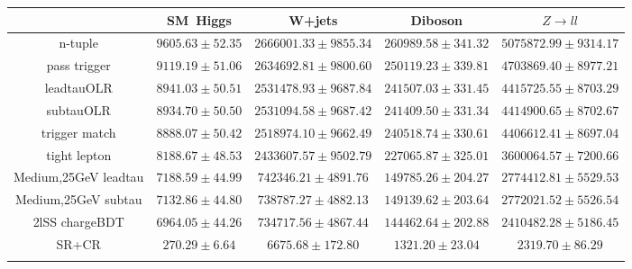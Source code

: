 \centering
\begin{tabular}{ccccc} \toprule\toprule
 & SM~Higgs & W+jets & Diboson & $Z\to ll$\\\midrule
n-tuple & $9605.63\pm52.35$ & $2666001.33\pm9855.34$ & $260989.58\pm341.32$ & $5075872.99\pm9314.17$\\
pass trigger & $9119.19\pm51.06$ & $2634692.81\pm9800.60$ & $250119.23\pm339.81$ & $4703869.40\pm8977.21$\\
leadtauOLR & $8941.03\pm50.51$ & $2531478.93\pm9687.84$ & $241507.03\pm331.45$ & $4415725.55\pm8703.29$\\
subtauOLR & $8934.70\pm50.50$ & $2531094.58\pm9687.42$ & $241409.50\pm331.34$ & $4414900.65\pm8702.67$\\
trigger match & $8888.07\pm50.42$ & $2518974.10\pm9662.49$ & $240518.74\pm330.61$ & $4406612.41\pm8697.04$\\
tight lepton & $8188.67\pm48.53$ & $2433607.57\pm9502.79$ & $227065.87\pm325.01$ & $3600064.57\pm7200.66$\\
Medium,25GeV leadtau & $7188.59\pm44.99$ & $742346.21\pm4891.76$ & $149785.26\pm204.27$ & $2774412.81\pm5529.53$\\
Medium,25GeV subtau & $7132.86\pm44.80$ & $738787.27\pm4882.13$ & $149139.62\pm203.64$ & $2772021.52\pm5526.54$\\
2lSS chargeBDT & $6964.05\pm44.26$ & $734717.56\pm4867.44$ & $144462.64\pm202.88$ & $2410482.28\pm5186.45$\\
SR+CR & $270.29\pm6.64$ & $6675.68\pm172.80$ & $1321.20\pm23.04$ & $2319.70\pm86.29$\\
\bottomrule\bottomrule\\
\end{tabular}
